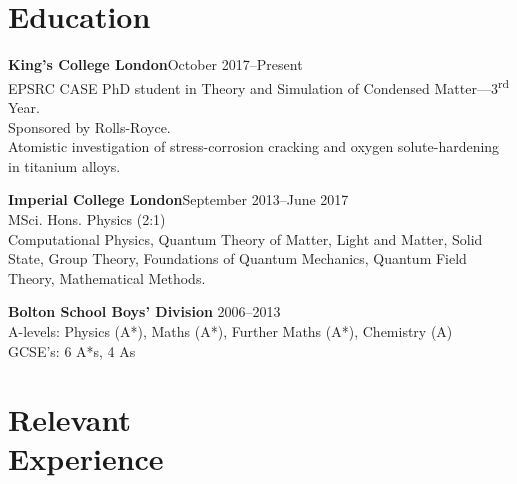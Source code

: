 \documentclass[margin]{res}
\begin{document}
 

 
\address{{\bf Present Address} \\ 27 Palfrey Place \\ London, SW8 1PB}
\address{{\bf Permanent Address} \\ 174 Crompton Way \\ Bolton, BL2 2SA \\}

 
\begin{resume} 
 

  \section{Education}
{\bf King's College London}\hfill October 2017--Present\\
EPSRC CASE PhD student in Theory and Simulation of Condensed Matter---3\textsuperscript{rd} Year.\\
Sponsored by Rolls-Royce.\\
Atomistic investigation of stress-corrosion cracking and oxygen solute-hardening in titanium alloys. 


{\bf Imperial College London}\hfill September 2013--June 2017\\
MSci. Hons. Physics (2:1)\\
Computational Physics, Quantum Theory of Matter, Light and Matter, Solid State, Group Theory, Foundations of Quantum Mechanics, Quantum Field Theory, Mathematical Methods.%

{\bf Bolton School Boys' Division} \hfill 2006--2013 \\
A-levels: Physics (A*), Maths (A*), Further Maths (A*), Chemistry (A)\\
GCSE's: 6 A*s, 4 As
 

\section{Relevant\\ Experience}


\end{resume}
\end{document}
